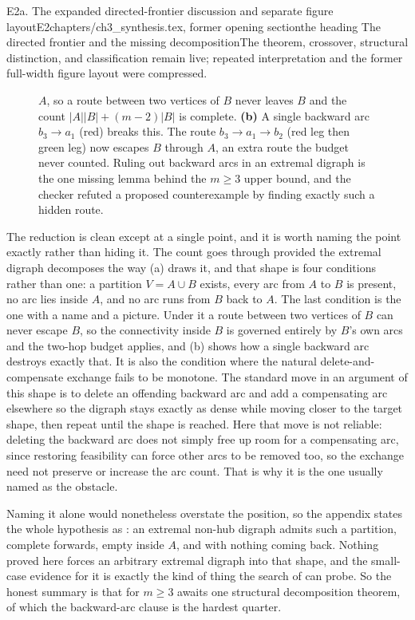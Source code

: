 \begin{offcut}{E2a. The expanded directed-frontier discussion and separate figure layout}{E2}{chapters/ch3\_synthesis.tex, former opening section}{the heading The directed frontier and the missing decomposition}{The theorem, crossover, structural distinction, and classification remain live; repeated interpretation and the former full-width figure layout were compressed.}
\begin{figure}[ht]
{$A$, so a route between two vertices of $B$ never leaves $B$ and the count
$|A||B| + (m-2)|B|$ is complete. \textbf{(b)} A single backward arc
$b_3 \to a_1$ (red) breaks this. The route $b_3 \to a_1 \to b_2$ (red leg then
green leg) now escapes $B$ through $A$, an extra route the budget never
counted. Ruling out backward arcs in an extremal digraph is the one missing
lemma behind the $m \ge 3$ upper bound, and the checker refuted a proposed
counterexample by finding exactly such a hidden route.}
\end{figure}

The reduction is clean except at a single point, and it is worth naming the point exactly rather than hiding it. The count goes through provided the extremal digraph decomposes the way (a) draws it, and that shape is four conditions rather than one: a partition $V = A \cup B$ exists, every arc from $A$ to $B$ is present, no arc lies inside $A$, and no arc runs from $B$ back to $A$. The last condition is the one with a name and a picture. Under it a route between two vertices of $B$ can never escape $B$, so the connectivity inside $B$ is governed entirely by $B$'s own arcs and the two-hop budget applies, and (b) shows how a single backward arc destroys exactly that. It is also the condition where the natural delete-and-compensate exchange fails to be monotone. The standard move in an argument of this shape is to delete an offending backward arc and add a compensating arc elsewhere so the digraph stays exactly as dense while moving closer to the target shape, then repeat until the shape is reached. Here that move is not reliable: deleting the backward arc does not simply free up room for a compensating arc, since restoring feasibility can force other arcs to be removed too, so the exchange need not preserve or increase the arc count. That is why it is the one usually named as the obstacle.

Naming it alone would nonetheless overstate the position, so the appendix states the whole hypothesis as : an extremal non-hub digraph admits such a partition, complete forwards, empty inside $A$, and with nothing coming back. Nothing proved here forces an arbitrary extremal digraph into that shape, and the small-case evidence for it is exactly the kind of thing the search of  can probe. So the honest summary is that  for $m \ge 3$ awaits one structural decomposition theorem, of which the backward-arc clause is the hardest quarter.


\end{offcut}
